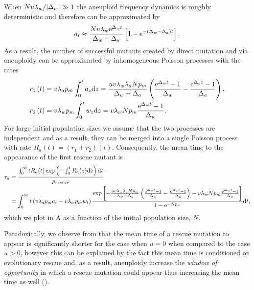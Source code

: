 \documentclass[12pt]{extarticle}
\renewcommand{\d}[1]{\ensuremath{\operatorname{d}\!{#1}}}
\renewcommand{\d}{{\rm d}}
\newcommand{\e}{{\rm e}}
\begin{document}
\begin{appendices}
When $Nu\lambda_w/\abs{\Delta_w}\gg1$ the aneuploid frequency dynamics is roughly deterministic and therefore can be approximated by 
\begin{equation}\label{aneuploidpopeq}
a_t \approx \frac{Nu\lambda_w\e^{\Delta_wt}}{\Delta_w-\Delta_a}\left[1-\e^{-\left(\Delta_w-\Delta_a\right)t}\right].
\end{equation}
As a result, the number of successful mutants created by direct mutation and via aneuploidy can be approximated by inhomogeneous Poisson processes with the rates
\begin{align}\label{eq:twosteplineage}
r_1\left(t\right)&=v\lambda_ap_m\int_0^ta_{z} \d z = \frac{uv\lambda_w\lambda_aNp_m}{\Delta_w-\Delta_a}\left(\frac{\e^{\Delta_wt}-1}{\Delta_w}-\frac{\e^{\Delta_at}-1}{\Delta_a}\right),\\ \label{eq:twosteplineagedirect}
r_2\left(t\right)&=v\lambda_wp_m\int_0^tw_{z} \d z = v\lambda_wNp_m\frac{\e^{\Delta_w t}-1}{\Delta_w}.
\end{align}
For large initial population sizes we assume that the two processes are independent and as a result, they can be merged into a single Poisson process with rate $R_a(t)=\left(r_1+r_2\right)\left(t\right)$.
Consequently, the mean time to the appearance of the first rescue mutant is
\begin{align}\nonumber
\tau_a &= \frac{\int_{0}^{\infty}{tR_a(t)\exp\left(-\int_0^{t}{R_a(z)\d z}\right) \d t}}{p_{rescue}}\\ \label{meantimet2}
&=
\int_0^\infty t\left(v\lambda_ap_ma_t+v\lambda_wp_mw_t\right)\frac{\exp\left[-\frac{uv\lambda_w\lambda_aNp_m}{\Delta_w-\Delta_a}\left(\frac{\e^{\Delta_w t}-1}{\Delta_w}-\frac{\e^{\Delta_a t}-1}{\Delta_a}\right)-v\lambda_wNp_m\frac{\e^{\Delta_w t}-1}{\Delta_w}\right] }{1-\e^{-Np_w}}\d t,
\end{align}
which we plot in A as a function of the initial population size, $N$.

Paradoxically, we observe from  that the mean time of a rescue mutation to appear is significantly shorter for the case when $u=0$ when compared to the case $u>0$, however this can be explained by the fact this mean time is conditioned on evolutionary rescue and, as a result, aneuploidy increase the \emph{window of opportunity} in which a rescue mutation could appear thus increasing the mean time as well ().


\end{appendices}
\end{document}
